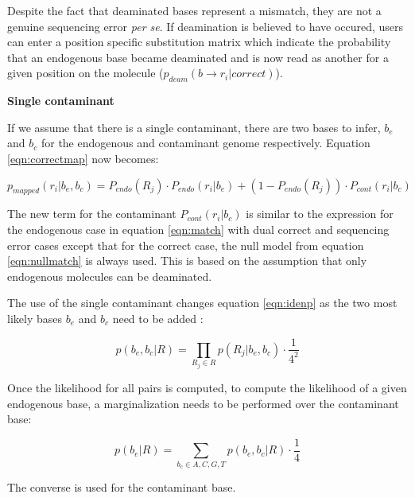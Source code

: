 \documentclass[a4paper,12pt]{article}
\begin{document}
\noindent Despite the fact that deaminated bases represent a mismatch, they are not a genuine sequencing error {\it per se}. If deamination is believed to have occured, users can enter a position specific substitution matrix which indicate the probability that an endogenous base became deaminated and is now read as another for a given position on the molecule ($p_{deam}(b \to r_i | correct)$). 

{\bf Single contaminant}

If we assume that there is a single contaminant, there are two bases to infer, $b_e$ and $b_c$ for the endogenous and contaminant genome respectively. Equation \ref{eqn:correctmap} now becomes:

\begin{equation}
p_{mapped}(r_i|b_e,b_c) =  P_{endo}(R_j) \cdot P_{endo} (r_i|b_e)   + (1-P_{endo}(R_j)) \cdot P_{cont} (r_i|b_c)
\end{equation}

\noindent The new term for the contaminant $P_{cont} (r_i|b_c)$ is similar to the expression for the endogenous case in equation \ref{eqn:match} with dual correct and sequencing error cases except that for the correct case, the null model from equation \ref{eqn:nullmatch} is always used. This is based on the assumption that only endogenous molecules can be deaminated. 

The use of the single contaminant changes equation \ref{eqn:idenp} as the two most likely bases $b_e$ and $b_c$ need to be added :

\begin{equation}
  p(b_e,b_c|R)   = \prod_{R_j \in R} p(R_j|b_e,b_c) \cdot \frac {1} {4^2} 
\end{equation} 

\noindent Once the likelihood for all pairs is computed, to compute the likelihood of a given endogenous base, a marginalization needs to be performed over the contaminant base: 

\begin{equation}
  p(b_e|R)   = \sum_{b_c \in {A,C,G,T}} p(b_e,b_c|R) \cdot \frac {1} {4} 
\end{equation} 

\noindent The converse is used for the contaminant base. 

\end{document}
